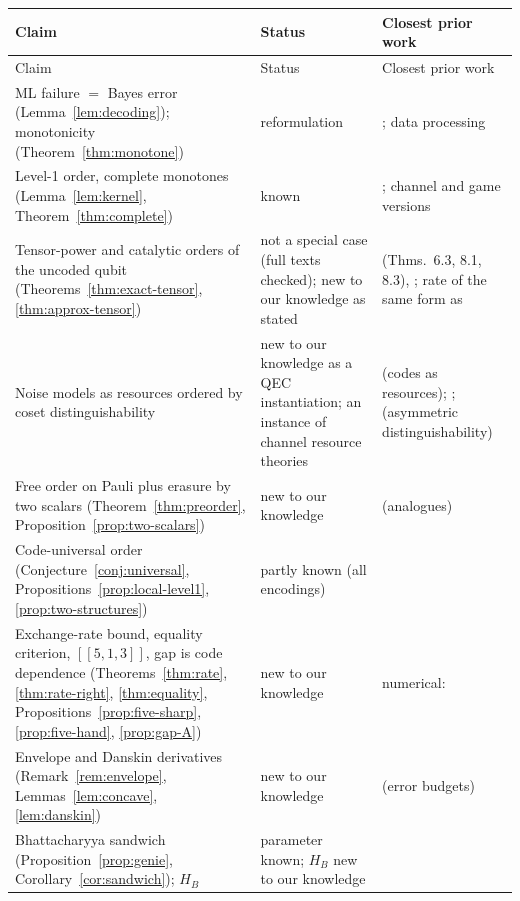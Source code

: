 {\footnotesize
\begin{longtable}{p{5.6cm} p{3.0cm} p{5.6cm}}
\toprule
Claim & Status & Closest prior work \\
\midrule
\endfirsthead
\toprule
Claim & Status & Closest prior work \\
\midrule
\endhead
ML failure $=$ Bayes error (Lemma~\ref{lem:decoding}); monotonicity (Theorem~\ref{thm:monotone}) & reformulation & \cite{DKLP,IyerPoulin,BSV,Pryadko}; data processing \\
Level-1 order, complete monotones (Lemma~\ref{lem:kernel}, Theorem~\ref{thm:complete}) & known & \cite{GGHKLN,Blackwell,Torgersen,Buscemi12,RHT}; channel and game versions \cite{Gour19,TakagiRegula,RBL,BGG,BuscemiGour} \\
Tensor-power and catalytic orders of the uncoded qubit (Theorems~\ref{thm:exact-tensor}, \ref{thm:approx-tensor}) & not a special case (full texts checked); new to our knowledge as stated & \cite{RHT} (Thms.~6.3, 8.1, 8.3), \cite{FFHT,MPST}; rate of the same form as~\cite{WW19} \\
Noise models as resources ordered by coset distinguishability & new to our knowledge as a QEC instantiation; an instance of channel resource theories & \cite{WLWL} (codes as resources); \cite{CDP08,LiuWinter,GourScandolo,Gour19}; \cite{WW19,WW19ch} (asymmetric distinguishability) \\
Free order on Pauli plus erasure by two scalars (Theorem~\ref{thm:preorder}, Proposition~\ref{prop:two-scalars}) & new to our knowledge & \cite{HircheShaya,HRSF,FKG} (analogues) \\
Code-universal order (Conjecture~\ref{conj:universal}, Propositions~\ref{prop:local-level1}, \ref{prop:two-structures}) & partly known (all encodings) & \cite{Shannon58,Buscemi18,Buscemi16} \\
Exchange-rate bound, equality criterion, $[[5,1,3]]$, gap is code dependence (Theorems~\ref{thm:rate}, \ref{thm:rate-right}, \ref{thm:equality}, Propositions~\ref{prop:five-sharp}, \ref{prop:five-hand}, \ref{prop:gap-A}) & new to our knowledge & numerical: \cite{SBD,WKPT,Sahay,KubicaErasure,Chang,GRK,GVRK} \\
Envelope and Danskin derivatives (Remark~\ref{rem:envelope}, Lemmas~\ref{lem:concave}, \ref{lem:danskin}) & new to our knowledge & \cite{Google22,Google24} (error budgets) \\
Bhattacharyya sandwich (Proposition~\ref{prop:genie}, Corollary~\ref{cor:sandwich}); $H_B$ & parameter known; $H_B$ new to our knowledge & \cite{DKP} \\

\end{longtable}}
